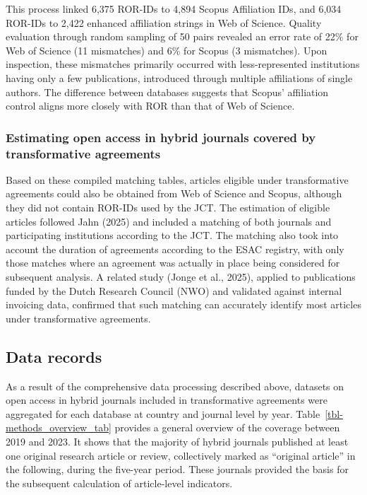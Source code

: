 \documentclass[a4paper,man,floatsintext,longtable,noextraspace,10pt]{apa6}
\begin{document}
This process linked 6,375 ROR-IDs to 4,894 Scopus Affiliation IDs, and
6,034 ROR-IDs to 2,422 enhanced affiliation strings in Web of Science.
Quality evaluation through random sampling of 50 pairs revealed an error
rate of 22\% for Web of Science (11 mismatches) and 6\% for Scopus (3
mismatches). Upon inspection, these mismatches primarily occurred with
less-represented institutions having only a few publications, introduced
through multiple affiliations of single authors. The difference between
databases suggests that Scopus' affiliation control aligns more closely
with ROR than that of Web of Science.

\subsubsection{Estimating open access in hybrid journals covered by
transformative
agreements}\label{estimating-open-access-in-hybrid-journals-covered-by-transformative-agreements}

Based on these compiled matching tables, articles eligible under
transformative agreements could also be obtained from Web of Science and
Scopus, although they did not contain ROR-IDs used by the JCT. The
estimation of eligible articles followed Jahn (2025) and included a
matching of both journals and participating institutions according to
the JCT. The matching also took into account the duration of agreements
according to the ESAC registry, with only those matches where an
agreement was actually in place being considered for subsequent
analysis. A related study (Jonge et al., 2025), applied to publications
funded by the Dutch Research Council (NWO) and validated against
internal invoicing data, confirmed that such matching can accurately
identify most articles under transformative agreements.

\subsection{Data records}\label{data-records}

As a result of the comprehensive data processing described above,
datasets on open access in hybrid journals included in transformative
agreements were aggregated for each database at country and journal
level by year. Table~\ref{tbl-methods_overview_tab} provides a general
overview of the coverage between 2019 and 2023. It shows that the
majority of hybrid journals published at least one original research
article or review, collectively marked as ``original article'' in the
following, during the five-year period. These journals provided the
basis for the subsequent calculation of article-level indicators.
\end{document}
